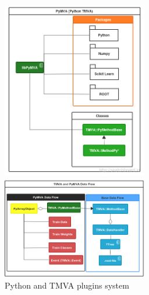 \documentclass[a4paper]{jpconf}
\begin{document}
\begin{figure}[h]
\centering
\begin{minipage}{15pc}
\includegraphics[width=15pc]{img/pymvaplugins.png}
\caption{\label{pymvaplug}Python and TMVA plugins system}
\end{minipage}\hspace{2pc}%
\begin{minipage}{15pc}
\includegraphics[width=15pc]{img/pymvadf.png}

\end{minipage}
\end{figure}
\end{document}
